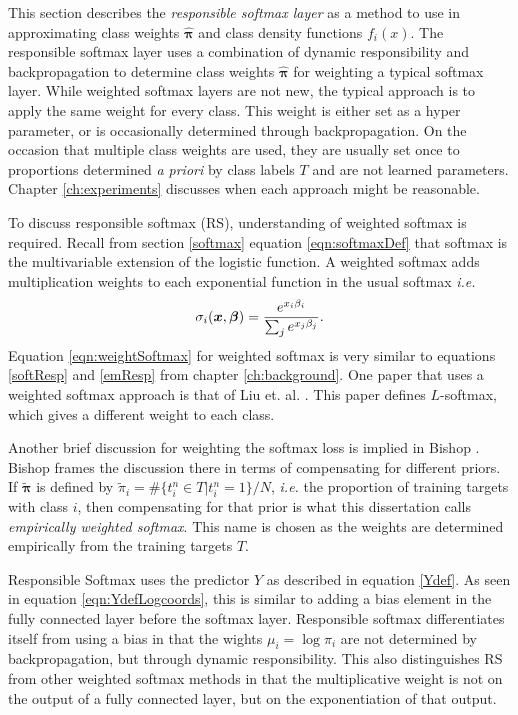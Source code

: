 \label{sect:LayerDesc}
This section describes the \textit{responsible softmax layer} as a method to use \DR in approximating class weights \( \hat{\bm \pi} \) and class density functions \( f_i(x) \). The responsible softmax layer uses a combination of dynamic responsibility and backpropagation to determine class weights \( \hat{\bm \pi} \) for weighting a typical softmax layer.  While weighted softmax layers are not new, the typical approach is to apply the same weight for every class.  This weight is either set as a hyper parameter, or is occasionally determined through backpropagation.  On the occasion that multiple class weights are used, they are usually set once to proportions determined \textit{a priori} by class labels \( T \) and are not learned parameters.  Chapter \ref{ch:experiments} discusses when each approach might be reasonable.

To discuss responsible softmax (RS), understanding of weighted softmax is required.  Recall from section \ref{softmax} equation \ref{eqn:softmaxDef} that softmax is the multivariable extension of the logistic function. A weighted softmax adds multiplication weights to each exponential function in the usual softmax \textit{i.e.}
\begin{equation}\label{eqn:weightSoftmax}
\sigma_i(\bm x,\bm{\beta}) = \dfrac{e^{x_i\beta_i}}{\sum_j e^{x_j\beta_j}}.
\end{equation}
Equation \ref{eqn:weightSoftmax} for weighted softmax is very similar to equations \ref{softResp} and \ref{emResp} from chapter \ref{ch:background}. One paper that uses a weighted softmax approach is that of Liu et. al. \cite{liu2016large}. This paper defines \( L \)-softmax, which gives a different weight to each class. 

Another brief discussion for weighting the softmax loss is implied in Bishop \cite[sect. 6.5]{Bishop1995}.  Bishop frames the discussion there in terms of compensating for different priors.  If \( \tilde{\!\bm\pi} \) is defined by \( \tilde{\!\pi}_i = \#\{t_i^{n}\in T|t_i^{n}=1\}/N \), \textit{i.e.} the proportion of training targets with class \( i \), then compensating for that prior is what this dissertation calls \textit{empirically weighted softmax}.  This name is chosen as the weights are determined empirically from the training targets \( T \).

Responsible Softmax uses the predictor \( Y \) as described in equation \ref{Ydef}.  As seen in equation \ref{eqn:YdefLogcoords}, this is similar to adding a bias element in the fully connected layer before the softmax layer. Responsible softmax differentiates itself from using a bias in that the wights \( \mu_i = \log\pi_i \) are not determined by backpropagation, but through dynamic responsibility.  This also distinguishes RS from other weighted softmax methods in that the multiplicative weight is not on the output of a fully connected layer, but on the exponentiation of that output.


